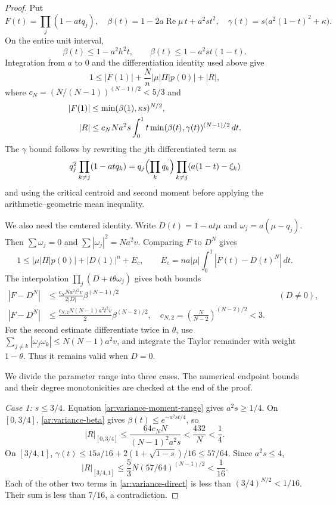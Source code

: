 \documentclass[11pt,reqno]{amsart}
\numberwithin{equation}{section}
\theoremstyle{definition}
\theoremstyle{remark}
\renewcommand{\Re}{\operatorname{Re}}
\begin{document}
\begin{proof}
Put
\[
 F(t)=\prod_j(1-atq_j),\quad
 \beta(t)=1-2a\Re\mu\,t+a^2st^2,\quad
 \gamma(t)=s\bigl(a^2(1-t)^2+\kappa\bigr).
\]
On the entire unit interval,
\begin{equation}\label{ar:variance-beta}
 \beta(t)\le1-a^2h^2t,
 \qquad \beta(t)\le1-a^2st(1-t).
\end{equation}
Integration from $a$ to $0$ and the differentiation identity used above
give
\begin{equation}\label{ar:variance-direct}
 1\le|F(1)|+\frac Nn|\mu|\Pi|p(0)|+|R|,
\end{equation}
where $c_N=(N/(N-1))^{(N-1)/2}<5/3$ and
\begin{align}
 |F(1)|&\le\min(\beta(1),\kappa s)^{N/2},\notag\\
 |R|&\le c_NNa^2s\int_0^1t\min(\beta(t),\gamma(t))^{(N-1)/2}\,dt.
 \label{ar:variance-remainder}
\end{align}
The $\gamma$ bound follows by rewriting the $j$th differentiated term
as
\[
 q_j^2\prod_{k\ne j}(1-atq_k)
 =q_j\Bigl(\prod_kq_k\Bigr)
       \prod_{k\ne j}(a(1-t)-\xi_k)
\]
and using the critical centroid and second moment before applying the
arithmetic--geometric mean inequality.

We also need the centered identity. Write $D(t)=1-at\mu$ and
$\omega_j=a(\mu-q_j)$. Then $\sum\omega_j=0$ and
$\sum|\omega_j|^2=Na^2v$. Comparing $F$ to $D^N$ gives
\begin{equation}\label{ar:variance-centered}
 1\le |\mu|\Pi|p(0)|+|D(1)|^n+E_c,
 \qquad E_c=na|\mu|\int_0^1|F(t)-D(t)^N|\,dt.
\end{equation}
The interpolation $\prod_j(D+t\theta\omega_j)$ gives both bounds
\begin{align}
 |F-D^N|&\le\frac{c_NNa^2t^2v}{2|D|}\beta^{(N-1)/2}
                  &&(D\ne0),\label{ar:center-first}\\
 |F-D^N|&\le\frac{c_{N,2}N(N-1)a^2t^2v}{2}\beta^{(N-2)/2},
 \quad c_{N,2}=\left(\frac N{N-2}\right)^{(N-2)/2}<3.
 \label{ar:center-second}
\end{align}
For the second estimate differentiate twice in $\theta$, use
$\sum_{j\ne k}|\omega_j\omega_k|\le N(N-1)a^2v$, and integrate
the Taylor remainder with weight $1-\theta$. Thus it remains valid
when $D=0$.

We divide the parameter range into three cases. The numerical endpoint
bounds and their degree monotonicities are checked at the end of the proof.

\smallskip
\noindent\emph{Case 1: $s\le3/4$.}
Equation \eqref{ar:variance-moment-range} gives $a^2s\ge1/4$.
On $[0,3/4]$, \eqref{ar:variance-beta} gives
$\beta(t)\le e^{-a^2st/4}$, so
\[
 |R|_{[0,3/4]}\le\frac{64c_NN}{(N-1)^2a^2s}
 <\frac{432}{N}<\frac14.
\]
On $[3/4,1]$,
$\gamma(t)\le15s/16+2(1+\sqrt{1-s})/16\le57/64$.
Since $a^2s\le4$,
\[
 |R|_{[3/4,1]}\le\frac53N(57/64)^{(N-1)/2}
 <\frac1{16}.
\]
Each of the other two terms in \eqref{ar:variance-direct} is less than
$(3/4)^{N/2}<1/16$. Their sum is less than $7/16$, a contradiction.


\end{proof}
\end{document}
